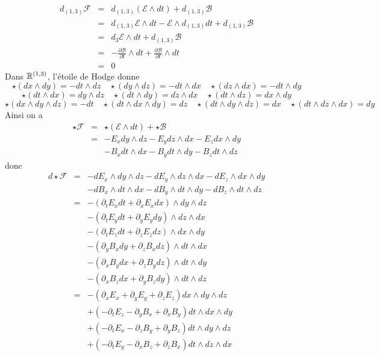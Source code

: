 \documentclass[12pt, a4paper]{book}
\begin{document}
\begin{eqnarray*}
d_{(1,3)}\mathscr{F} &=& d_{(1,3)}(\mathscr{E}\wedge dt) + d_{(1,3)}\mathscr{B} \\
&=& d_{(1,3)}\mathscr{E} \wedge dt - \mathscr{E} \wedge d_{(1,3)}dt + d_{(1,3)}\mathscr{B} \\
&=& d_3\mathscr{E} \wedge dt + d_{(1,3)}\mathscr{B} \\
&=& -\frac{\partial \mathscr{B}}{\partial t}\wedge dt + \frac{\partial \mathscr{B}}{\partial t}\wedge dt \\
&=& 0
\end{eqnarray*}
Dans $\mathbb{R}^{(1, 3)}$, l'étoile de Hodge donne 
$$\star(dx\wedge dy) = - dt\wedge dz \quad \star(dy\wedge dz) = - dt\wedge dx \quad \star(dz\wedge dx) = - dt\wedge dy$$
$$\star(dt\wedge dx) = dy\wedge dz \quad \star(dt\wedge dy) =  dz\wedge dx \quad \star(dt\wedge dz) = dx\wedge dy$$
$$\star(dx\wedge dy\wedge dz) = - dt \quad \star(dt\wedge dx\wedge dy) = dz \quad \star(dt\wedge dy\wedge dz) = dx \quad \star(dt\wedge dz\wedge dx) = dy$$
Ainsi on a 
\begin{eqnarray*}
\star \mathscr{F} &=& \star(\mathscr{E}\wedge dt) + \star \mathscr{B}  \\
&=& - E_x dy \wedge dz - E_y dz \wedge dx - E_z dx \wedge dy \\
& & -B_x dt \wedge dx - B_y dt \wedge dy - B_z dt \wedge dz
\end{eqnarray*}
donc
\begin{eqnarray*}
d\star \mathscr{F} &=& - d E_x \wedge dy \wedge dz - d E_y \wedge dz \wedge dx - d E_z \wedge dx \wedge dy \\
& & -d B_x\wedge dt \wedge dx - d B_y\wedge dt \wedge dy - d B_z\wedge dt \wedge dz \\
&=& -(\partial_t E_x dt + \partial_x E_x dx)\wedge dy \wedge dz \\
& & -(\partial_t E_y dt + \partial_y E_y dy)\wedge dz \wedge dx \\
& & -(\partial_t E_z dt + \partial_z E_z dz)\wedge dx \wedge dy \\
& & -(\partial_y B_x dy + \partial_z B_x dz)\wedge dt \wedge dx \\
& & -(\partial_x B_y dx + \partial_z B_y dz)\wedge dt \wedge dy \\
& & -(\partial_x B_z dx + \partial_y B_z dy)\wedge dt \wedge dz \\
&=& -(\partial_x E_x + \partial_y E_y + \partial_z E_z)dx \wedge dy \wedge dz \\
& & +(-\partial_t E_z - \partial_y B_x + \partial_x B_y) dt \wedge dx \wedge dy \\
& & +(-\partial_t E_x - \partial_z B_y + \partial_y B_z) dt \wedge dy \wedge dz \\
& & +(-\partial_t E_y - \partial_x B_z + \partial_z B_x) dt \wedge dz \wedge dx 
\end{eqnarray*}
\end{document}
